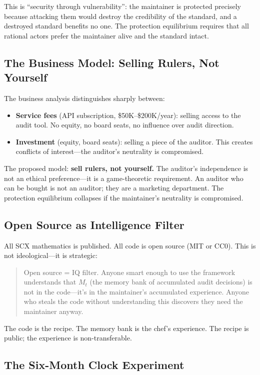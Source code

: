 \documentclass[12pt,a4paper]{ctexart}
\begin{document}
This is ``security through vulnerability'': the maintainer is protected precisely because attacking them would destroy the credibility of the standard, and a destroyed standard benefits no one. The protection equilibrium requires that all rational actors prefer the maintainer alive and the standard intact.

\subsection{The Business Model: Selling Rulers, Not Yourself}

The business analysis distinguishes sharply between:
\begin{itemize}
\item \textbf{Service fees} (API subscription, \$50K–\$200K/year): selling access to the audit tool. No equity, no board seats, no influence over audit direction.
\item \textbf{Investment} (equity, board seats): selling a piece of the auditor. This creates conflicts of interest—the auditor's neutrality is compromised.
\end{itemize}

The proposed model: \textbf{sell rulers, not yourself.} The auditor's independence is not an ethical preference—it is a game-theoretic requirement. An auditor who can be bought is not an auditor; they are a marketing department. The protection equilibrium collapses if the maintainer's neutrality is compromised.

\subsection{Open Source as Intelligence Filter}

All SCX mathematics is published. All code is open source (MIT or CC0). This is not ideological—it is strategic:

\begin{quote}
Open source = IQ filter. Anyone smart enough to use the framework understands that $M_t$ (the memory bank of accumulated audit decisions) is not in the code—it's in the maintainer's accumulated experience. Anyone who steals the code without understanding this discovers they need the maintainer anyway.
\end{quote}

The code is the recipe. The memory bank is the chef's experience. The recipe is public; the experience is non-transferable.

\subsection{The Six-Month Clock Experiment}
\end{document}
